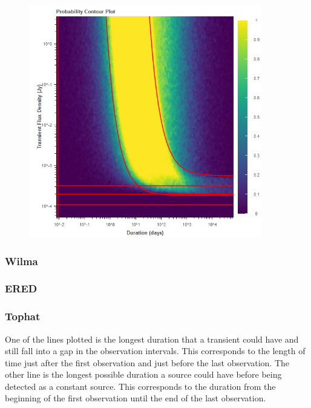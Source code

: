 \documentclass{article}
\begin{document}
\begin{figure}[H] 
	\begin{center}
		\includegraphics[width=4in]{output_fred_ProbContour.png}
				
		\label{FRED}
	\end{center}
\end{figure}
\subsubsection{Wilma}
\subsubsection{ERED}
\subsubsection{Tophat}
One of the lines plotted is the longest duration that a transient could have and still fall into a gap in the observation intervals. This corresponds to the length of time just after the first observation and just before the last observation. The other line is the longest possible duration a source could have before being detected as a constant source. This corresponds to the duration from the beginning of the first observation until the end of the last observation.
\end{document}

